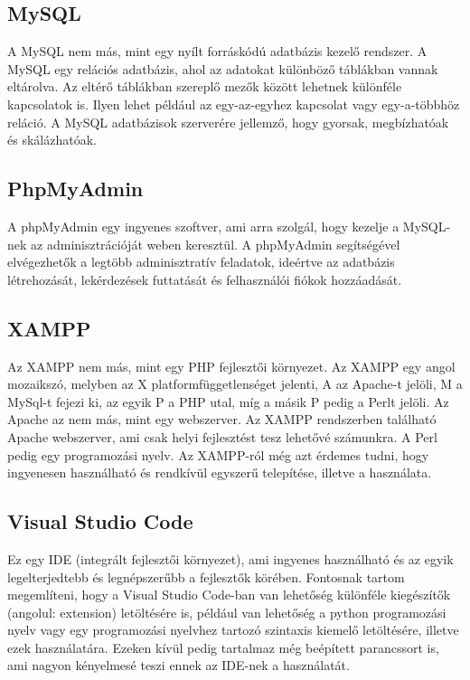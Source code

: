 \documentclass[]{thesis-ekf}
\theoremstyle{definition}
\theoremstyle{remark}
\begin{document}
	\subsection{MySQL}
		A MySQL nem más, mint egy nyílt forráskódú adatbázis kezelő rendszer. A MySQL egy relációs adatbázis, ahol az adatokat különböző táblákban vannak eltárolva. Az eltérő táblákban szereplő mezők között lehetnek különféle kapcsolatok is. Ilyen lehet például az egy-az-egyhez kapcsolat vagy egy-a-többhöz reláció. A MySQL adatbázisok szerverére jellemző, hogy gyorsak, megbízhatóak és skálázhatóak.
		\cite{MySQL}
	\subsection{PhpMyAdmin}
		A phpMyAdmin egy ingyenes szoftver, ami arra szolgál, hogy kezelje a MySQL-nek az adminisztrációját weben keresztül. A phpMyAdmin segítségével elvégezhetők a legtöbb adminisztratív feladatok, ideértve az adatbázis létrehozását, lekérdezések futtatását és felhasználói fiókok hozzáadását. \cite{PhpMyAdmin}
	\subsection{XAMPP}
		Az XAMPP nem más, mint egy PHP fejlesztői környezet. Az XAMPP egy angol mozaikszó, melyben az X platformfüggetlenséget jelenti, A az Apache-t jelöli, M a MySql-t fejezi ki, az egyik P a PHP utal, míg a másik P pedig a Perlt jelöli. Az Apache az nem más, mint egy webszerver. Az XAMPP rendszerben található Apache webszerver, ami csak helyi fejlesztést tesz lehetővé számunkra. A Perl pedig egy programozási nyelv. Az XAMPP-ról még azt érdemes tudni, hogy ingyenesen használható és rendkívül egyszerű telepítése, illetve a használata. \cite{XAMPP}
	\subsection{Visual Studio Code}
		Ez egy IDE (integrált fejlesztői környezet), ami ingyenes használható és az egyik legelterjedtebb és legnépszerűbb a fejlesztők körében. Fontosnak tartom megemlíteni, hogy a Visual Studio Code-ban van lehetőség különféle kiegészítők (angolul: extension) letöltésére is, például van lehetőség a python programozási nyelv vagy egy programozási nyelvhez tartozó szintaxis kiemelő letöltésére, illetve ezek használatára. Ezeken kívül pedig tartalmaz még beépített parancssort is, ami nagyon kényelmesé teszi ennek az IDE-nek a használatát. 
\end{document}
